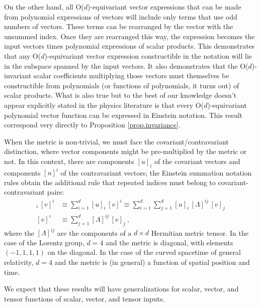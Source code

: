 \documentclass{article}
\theoremstyle{Hogg}
\begin{document}
On the other hand, all O($d$)-equivariant vector expressions that can be made from polynomial expressions of vectors will include only terms that use odd numbers of vectors.
These terms can be rearranged by the vector with the unsummed index.
Once they are rearranged this way, the expression becomes the input vectors times polynomial expressions of scalar products.
This demonstrates that any O($d$)-equivariant vector expression constructible in the notation will lie in the subspace spanned by the input vectors.
It also demonstrates that the O($d$)-invariant scalar coefficients multiplying those vectors must themselves be constructible from polynomials (or functions of polynomials, it turns out) of scalar products.
What is also true but to the best of our knowledge doesn't appear explicitly stated in the physics literature is that every O($d$)-equivariant polynomial vector function can be expressed in Einstein notation. This result correspond very directly to Proposition \ref{prop.invariance}.

When the metric is non-trivial, we must face the covariant/contravariant distinction, where vector components might be pre-multiplied by the metric or not.
In this context, there are components $[u]_i$ of the covariant vectors and components $[u]^i$ of the contravariant vectors; the Einstein summation notation rules obtain the additional rule that repeated indices must belong to covariant-contravariant pairs:
\begin{align}
    [u]_i\,[v]^i &\equiv \sum_{i=1}^d [u]_i\,[v]^i \equiv \sum_{i=1}^d \sum_{j=1}^d [u]_i\,[\Lambda]^{ij}\,[v]_j
    \\
    [v]^i &\equiv \sum_{j=1}^d [\Lambda]^{ij}\,[v]_j
    ~,
\end{align}
where the $[\Lambda]^{ij}$ are the components of a $d\times d$ Hermitian metric tensor.
In the case of the Lorentz group, $d=4$ and the metric is diagonal, with elements $(-1,1,1,1)$ on the diagonal.
In the case of the curved spacetime of general relativity, $d=4$ and the metric is (in general) a function of spatial position and time.

We expect that these results will have generalizations for scalar, vector, and tensor functions of scalar, vector, and tensor inputs.
\end{document}
